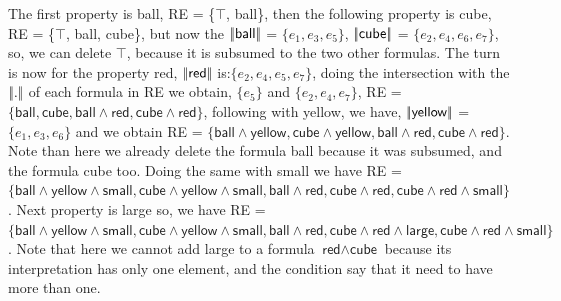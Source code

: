 The first property is \textsf{ball}, RE = \{$\top$, \textsf{ball}\}, then the following property is \textsf{cube}, RE = \{$\top$, \textsf{ball}, \textsf{cube}\}, but now the $|\!|\textsf{ball}|\!|$ = $\{e_1, e_3, e_5\}$, $|\!|\textsf{cube}|\!|$ = $\{e_2, e_4, e_6, e_7\}$, so, we can delete $\top$, because it is subsumed to the two other formulas. The turn is now for the property \textsf{red}, $|\!|\textsf{red}|\!|$ is:$\{e_2, e_4, e_5, e_7\}$, doing the intersection with the $|\!|.|\!|$ of each formula in RE we obtain, $\{e_5\}$ and $\{e_2, e_4, e_7\}$, RE = $\{\textsf{ball}, \textsf{cube}, \textsf{ball} \wedge \textsf{red}, \textsf{cube} \wedge \textsf{red}\}$, following with \textsf{yellow}, we have, $|\!|\textsf{yellow}|\!|$ = $\{e_1, e_3, e_6\}$ and we obtain RE = $\{\textsf{ball} \wedge \textsf{yellow}, \textsf{cube} \wedge \textsf{yellow}, \textsf{ball} \wedge \textsf{red}, \textsf{cube} \wedge \textsf{red}\}$. Note than here we already delete the formula \textsf{ball} because it was subsumed, and the formula \textsf{cube} too.
Doing the same with \textsf{small} we have RE = $\{\textsf{ball} \wedge \textsf{yellow} \wedge \textsf{small}, \textsf{cube} \wedge \textsf{yellow} \wedge \textsf{small}, \textsf{ball} \wedge \textsf{red}, \textsf{cube} \wedge \textsf{red}, \textsf{cube} \wedge \textsf{red} \wedge \textsf{small}\}$. Next property is \textsf{large} so, we have RE = $\{\textsf{ball} \wedge \textsf{yellow} \wedge \textsf{small}, \textsf{cube} \wedge \textsf{yellow} \wedge \textsf{small}, \textsf{ball} \wedge \textsf{red}, \textsf{cube} \wedge \textsf{red} \wedge \textsf{large}, \textsf{cube} \wedge \textsf{red} \wedge \textsf{small}\}$. Note that here we cannot add \textsf{large} to a formula $\textsf{red} \wedge \textsf{cube}$ because its interpretation has only one element, and the condition say that it need to have more than one.

